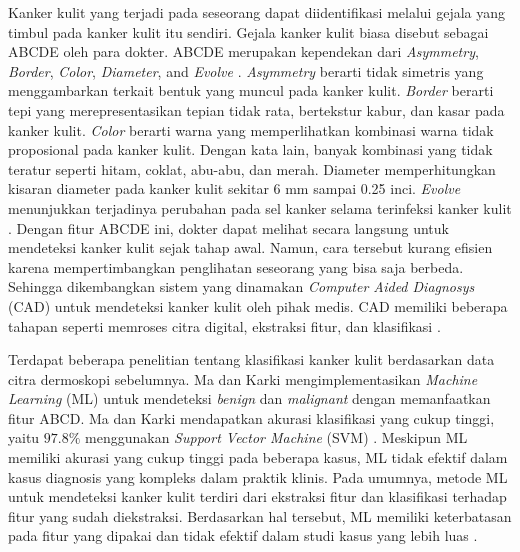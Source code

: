     Kanker kulit yang terjadi pada seseorang dapat diidentifikasi melalui gejala yang timbul pada kanker kulit itu sendiri. Gejala kanker kulit biasa disebut sebagai ABCDE oleh para dokter. ABCDE merupakan kependekan dari \textit{Asymmetry}, \textit{Border}, \textit{Color}, \textit{Diameter}, and \textit{Evolve} \citep{Gavrilov2019a}. \textit{Asymmetry} berarti tidak simetris yang menggambarkan terkait bentuk yang muncul pada kanker kulit. \textit{Border} berarti tepi yang merepresentasikan tepian tidak rata, bertekstur kabur, dan kasar pada kanker kulit. \textit{Color} berarti warna yang memperlihatkan kombinasi warna tidak proposional pada kanker kulit. Dengan kata lain, banyak kombinasi yang tidak teratur seperti hitam, coklat, abu-abu, dan merah. Diameter memperhitungkan kisaran diameter pada kanker kulit sekitar 6 mm sampai 0.25 inci. \textit{Evolve} menunjukkan terjadinya perubahan pada sel kanker selama terinfeksi kanker kulit \citep{Saherish2020a}. Dengan fitur ABCDE ini, dokter dapat melihat secara langsung untuk mendeteksi kanker kulit sejak tahap awal. Namun, cara tersebut kurang efisien karena mempertimbangkan penglihatan seseorang yang bisa saja berbeda. Sehingga dikembangkan sistem yang dinamakan \textit{Computer Aided Diagnosys} (CAD) untuk mendeteksi kanker kulit oleh pihak medis. CAD memiliki beberapa tahapan seperti memroses citra digital, ekstraksi fitur, dan klasifikasi \citep{Adyanti2017}.

    Terdapat beberapa penelitian tentang klasifikasi kanker kulit berdasarkan data citra dermoskopi sebelumnya. Ma dan Karki mengimplementasikan \textit{Machine Learning} (ML) untuk mendeteksi \textit{benign} dan \textit{malignant} dengan memanfaatkan fitur ABCD. Ma dan Karki mendapatkan akurasi klasifikasi yang cukup tinggi, yaitu $97.8\%$ menggunakan \textit{Support Vector Machine} (SVM) \citep{Ma2020}. Meskipun ML memiliki akurasi yang cukup tinggi pada beberapa kasus, ML tidak efektif dalam kasus diagnosis yang kompleks dalam praktik klinis. Pada umumnya, metode ML untuk mendeteksi kanker kulit terdiri dari ekstraksi fitur dan klasifikasi terhadap fitur yang sudah diekstraksi. Berdasarkan hal tersebut, ML memiliki keterbatasan pada fitur yang dipakai dan tidak efektif dalam studi kasus yang lebih luas \citep{Wu2022}.


